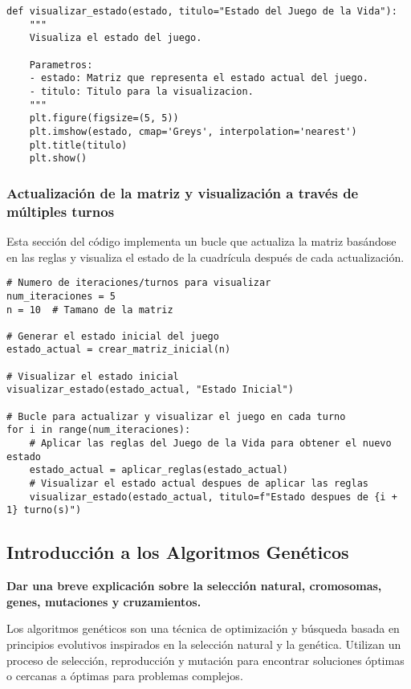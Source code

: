 \begin{lstlisting}
def visualizar_estado(estado, titulo="Estado del Juego de la Vida"):
    """
    Visualiza el estado del juego.
    
    Parametros:
    - estado: Matriz que representa el estado actual del juego.
    - titulo: Titulo para la visualizacion.
    """
    plt.figure(figsize=(5, 5))
    plt.imshow(estado, cmap='Greys', interpolation='nearest')
    plt.title(titulo)
    plt.show()
\end{lstlisting}

\subsubsection*{Actualización de la matriz y visualización a través de múltiples turnos}

Esta sección del código implementa un bucle que actualiza la matriz basándose en las reglas y 
visualiza el estado de la cuadrícula después de cada actualización.

\begin{lstlisting}
# Numero de iteraciones/turnos para visualizar
num_iteraciones = 5
n = 10  # Tamano de la matriz

# Generar el estado inicial del juego
estado_actual = crear_matriz_inicial(n)

# Visualizar el estado inicial
visualizar_estado(estado_actual, "Estado Inicial")

# Bucle para actualizar y visualizar el juego en cada turno
for i in range(num_iteraciones):
    # Aplicar las reglas del Juego de la Vida para obtener el nuevo estado
    estado_actual = aplicar_reglas(estado_actual)
    # Visualizar el estado actual despues de aplicar las reglas
    visualizar_estado(estado_actual, titulo=f"Estado despues de {i + 1} turno(s)")
\end{lstlisting}


\subsection{Introducción a los Algoritmos Genéticos}

\textbf{Dar una breve explicación sobre la selección natural, cromosomas,
genes, mutaciones y cruzamientos.}


Los algoritmos genéticos son una técnica de optimización y búsqueda basada en principios evolutivos inspirados en la selección natural y la genética. Utilizan un proceso de selección, reproducción y mutación para encontrar soluciones óptimas o cercanas a óptimas para problemas complejos.

